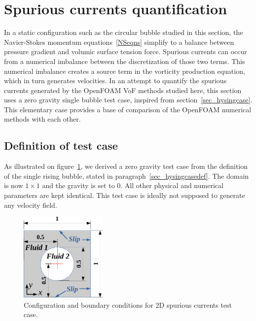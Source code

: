 \documentclass[review]{elsarticle}
\begin{document}
\clearpage
\section{Spurious currents quantification}\label{sec_spuriouscase}

In a static configuration such as the circular bubble studied in this section, the Navier-Stokes momentum equations~\ref{NSeqns} simplify to a balance between pressure gradient and volumic surface tension force. Spurious currents can occur from a numerical imbalance between the discretization of those two terms. This numerical imbalance creates a source term in the vorticity production equation, which in turn generates velocities. 
In an attempt to quantify the spurious currents generated by the OpenFOAM VoF methods studied here, this section uses a zero gravity single bubble test case, inspired from section~\ref{sec_hysingcase}. This elementary case provides a base of comparison of the OpenFOAM numerical methods with each other.

\subsection{Definition of test case}\label{sec_spuriouscasedef}

As illustrated on figure~\ref{fig:spuriousCurrents_scheme}, we derived a zero gravity test case from the definition of the single rising bubble, stated in paragraph~\ref{sec_hysingcasedef}. The domain is now $1\times 1$ and the gravity is set to 0. All other physical and numerical parameters are kept identical. This test case is ideally not supposed to generate any velocity field. 

\begin{figure}[!h]
\begin{center}
 \vspace{-1mm}
 \includegraphics[width=4.25cm]{figures/spuriousCurrents_scheme.pdf}
 \vspace{-7mm}
\end{center}
\caption{Configuration and boundary conditions for 2D spurious currents test case.}
\label{fig:spuriousCurrents_scheme}
\end{figure}
\end{document}
